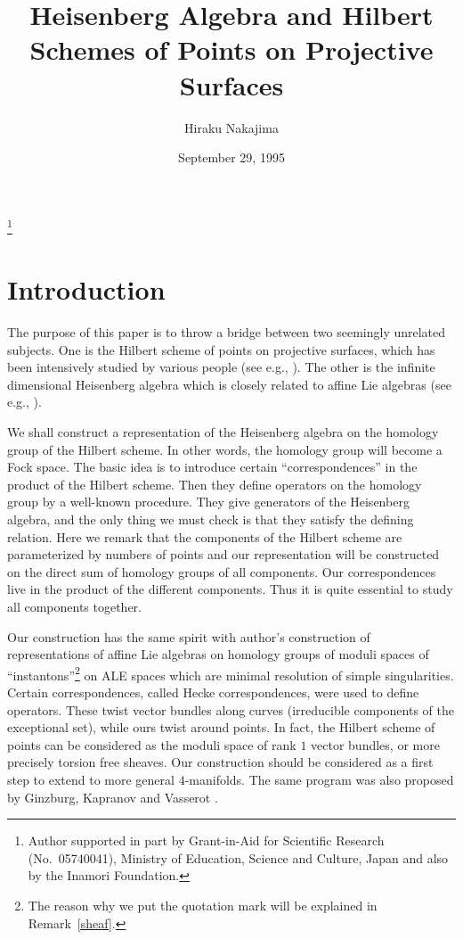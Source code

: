 \documentclass[12pt]{amsart}
\theoremstyle{definition}
\theoremstyle{remark}
\numberwithin{equation}{section}
\begin{document}
\title[Heisenberg Algebra and Hilbert Schemes]
{Heisenberg Algebra and Hilbert Schemes of Points on Projective Surfaces}
\author{Hiraku Nakajima}
\address{Department of Mathematical Sciences, University of Tokyo\\
Komaba 3-8-1, Meguro-ku, Tokyo 153, Japan}
\thanks{Author supported in part by Grant-in-Aid for Scientific Research
(No.\ 05740041), Ministry of Education, Science and Culture, Japan
and also by the Inamori Foundation.
}
\date{September 29, 1995}
\maketitle

%
%
\section{Introduction}
%
The purpose of this paper is to throw a bridge between two seemingly
unrelated subjects. One is the Hilbert scheme of points on projective
surfaces, which has been intensively studied by various people (see
e.g., \cite{Iar,ES,Got,Go-book}). The other is the infinite
dimensional Heisenberg algebra which is closely related to affine Lie
algebras (see e.g., \cite{Kac}).

We shall construct a representation of the Heisenberg algebra on the
homology group of the Hilbert scheme.  In other words, the homology
group will become a Fock space.  The basic idea is to introduce
certain ``correspondences'' in the product of the Hilbert scheme.
Then they define operators on the homology group by a well-known
procedure.  They give generators of the Heisenberg algebra, and the
only thing we must check is that they satisfy the defining relation.
Here we remark that the components of the Hilbert scheme are
parameterized by numbers of points and our representation will be
constructed on the direct sum of homology groups of all components.
Our correspondences live in the product of the different components.
Thus it is quite essential to study all components together.

Our construction has the same spirit with
author's construction \cite{Na-quiver,Na-gauge}
of representations of affine Lie algebras
on homology groups of moduli spaces of ``instantons''\footnote{The
reason why we put the quotation mark will be
  explained in Remark~\ref{sheaf}.}
on ALE spaces which are minimal resolution of simple singularities.
Certain correspondences, called Hecke correspondences, were used to
define operators. These twist vector bundles along
curves (irreducible components of the exceptional set), while ours
twist around points. In fact, the Hilbert scheme of points can be
considered as the moduli space of rank $1$ vector bundles, or more
precisely torsion free sheaves.
Our construction should be considered as a first step to extend
\cite{Na-quiver,Na-gauge} to more general $4$-manifolds.
The same program was also proposed by Ginzburg, Kapranov and Vasserot
\cite{GKV}.
\end{document}
